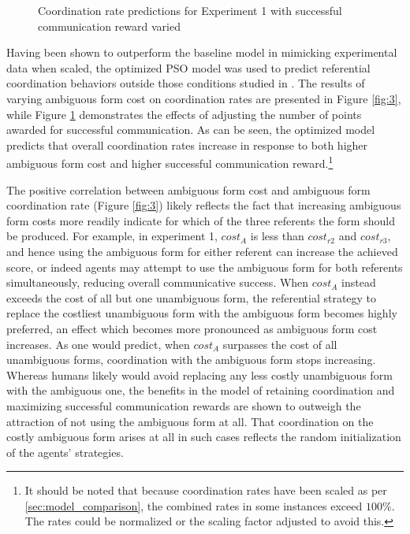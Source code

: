 \documentclass[a4paper,11pt]{article}
\begin{document}
\begin{figure}[t]
\centering
\scalebox{.425}{}
\caption{Coordination rate predictions for Experiment 1 with successful communication reward varied }
\label{fig:4}
\end{figure}

Having been shown to outperform the baseline model in mimicking experimental data when scaled, the optimized PSO model was used to predict referential coordination behaviors outside those conditions studied in . The results of varying ambiguous form cost on coordination rates are presented in Figure \ref{fig:3}, while Figure \ref{fig:4} demonstrates the effects of adjusting the number of points awarded for successful communication. As can be seen, the optimized model predicts that overall coordination rates increase in response to both higher ambiguous form cost and higher successful communication reward.\footnote{It should be noted that because coordination rates have been scaled as per \ref{sec:model_comparison}, the combined rates in some instances exceed $100\%$. The rates could be normalized or the scaling factor adjusted to avoid this.}


The positive correlation between ambiguous form cost and ambiguous form coordination rate (Figure \ref{fig:3}) likely reflects the fact that increasing ambiguous form costs more readily indicate for which of the three referents the form should be produced. For example, in experiment 1, $cost_A$ is less than $cost_{r2}$ and $cost_{r3}$, and hence using the ambiguous form for either referent can increase the achieved score, or indeed agents may attempt to use the ambiguous form for both referents simultaneously, reducing overall communicative success. When $cost_A$ instead exceeds the cost of all but one unambiguous form, the referential strategy to replace the costliest unambiguous form with the ambiguous form becomes highly preferred, an effect which becomes more pronounced as ambiguous form cost increases. As one would predict, when $cost_A$ surpasses the cost of all unambiguous forms, coordination with the ambiguous form stops increasing. Whereas humans likely would avoid replacing any less costly unambiguous form with the ambiguous one, the benefits in the model of retaining coordination and maximizing successful communication rewards are shown to outweigh the attraction of not using the ambiguous form at all. That coordination on the costly ambiguous form arises at all in such cases reflects the random initialization of the agents' strategies.
\end{document}
